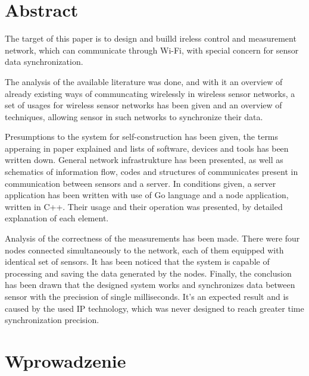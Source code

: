 \documentclass[12pt,oneside,a4paper]{book}
\theoremstyle{break}
\begin{document}
\chapter*{Abstract}
The target of this paper is to design and builld ireless control and measurement network,
which can communicate through Wi-Fi, with special concern for 
sensor data synchronization. 
\par The analysis of the available literature was done, and with it
an overview of already existing ways of communcating wirelessly in
wireless sensor networks, a set of usages for wireless sensor networks
has been given and an overview of techniques, allowing 
sensor in such networks to synchronize their data.
\par Presumptions to the system for self-construction has been given,
the terms apperaing in paper explained and lists of software, devices 
and tools has been written down. General network infrastrukture has been
presented, as well as schematics of information flow, codes and 
structures of communicates present in communication between sensors
and a server. In conditions given, a server application has been written
with use of Go language and a node application, written in C++.
Their usage and their operation was presented, by detailed explanation
of each element.
\par Analysis of the correctness of the measurements has been made. 
There were four nodes connected simultaneously to the network,
each of them equipped with identical set of sensors. It has been noticed
that the system is capable of processing and saving the data 
generated by the nodes. 
Finally, the conclusion has been drawn that 
the designed system works and synchronizes data between sensor 
with the precission of single milliseconds. It's an expected result
and is caused by the 
used IP technology, which was never designed to reach greater 
time synchronization precision.

\chapter*{Wprowadzenie}
\end{document}
